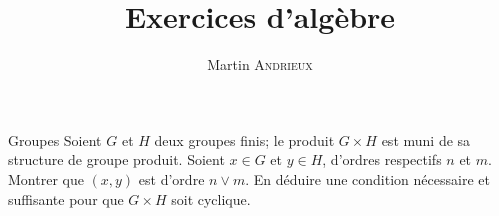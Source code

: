 \documentclass[french, a4paper, 11pt]{article}
\title{Exercices d'algèbre}
\author{Martin \textsc{Andrieux}}
\date{}
\begin{document}
\maketitle

\begin{cadre}{Groupes}
  Soient \(G\) et \(H\) deux groupes finis; le produit \(G\times H\) est muni de sa structure de groupe produit.
  Soient \(x\in G\) et \(y\in H\), d'ordres respectifs \(n\) et \(m\). Montrer que \((x,y)\) est d'ordre \(n\vee m\). En déduire une condition nécessaire et suffisante pour que \(G\times H\) soit cyclique.
\end{cadre}
\end{document}
